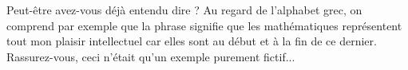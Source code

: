 \vspace{0.8em}

Peut-être avez-vous déjà entendu dire  ? Au regard de l'alphabet grec, on comprend par exemple que la phrase  signifie que les mathématiques représentent tout mon plaisir intellectuel car elles sont au début et à la fin de ce dernier. Rassurez-vous, ceci n'était qu'un exemple purement fictif...
